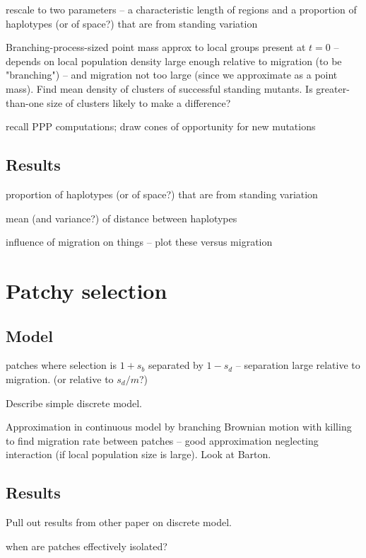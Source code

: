 \documentclass{article}
\begin{document}
rescale to two parameters
-- a characteristic length of regions and a proportion of haplotypes (or of space?) that are from standing variation

Branching-process-sized point mass approx to local groups present at $t=0$
-- depends on local population density large enough relative to migration (to be "branching")
-- and migration not too large (since we approximate as a point mass).
Find mean density of clusters of successful standing mutants. 
Is greater-than-one size of clusters likely to make a difference? 
 
recall PPP computations; draw cones of opportunity for new mutations 
 
\subsection{Results} 
 
proportion of haplotypes (or of space?) that are from standing variation 
 
mean (and variance?) of distance between haplotypes 
 
influence of migration on things -- plot these versus migration 
 
 
\section{Patchy selection} 
 
\subsection{Model} 
 
patches where selection is $1+s_b$ separated by $1-s_d$ -- separation large relative to migration.   
(or relative to $s_d/m$?) 
 
Describe simple discrete model. 
 
Approximation in continuous model by branching Brownian motion with killing to find migration rate between patches -- 
good approximation neglecting interaction (if local population size is large). 
Look at Barton. 
 
\subsection{Results} 
 
Pull out results from other paper on discrete model. 
 
when are patches effectively isolated? 
 
\end{document}
